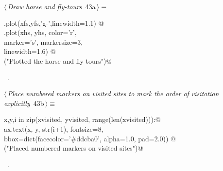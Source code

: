 \documentclass[11.5pt]{report}
\begin{document}
\begin{flushleft} \small
\begin{minipage}{\linewidth}\label{scrap55}\raggedright\small
{} $\langle\,${\itshape Draw horse and fly-tours}\nobreak\ {\footnotesize {43a}}$\,\rangle\equiv$
\vspace{-1ex}
\begin{list}{}{} \item
\mbox{}\verb@ax.plot(xfs,yfs,'g-',linewidth=1.1)  @\\
\mbox{}\verb@ax.plot(xhs, yhs, color='r', \@\\
\mbox{}\verb@        marker='s', markersize=3, \@\\
\mbox{}\verb@        linewidth=1.6) @\\
\mbox{}\verb@debug("Plotted the horse and fly tours")@\\
\mbox{}\verb@@{\NWsep}
\end{list}
\vspace{-1.5ex}
\footnotesize
\begin{list}{}{\setlength{\itemsep}{-\parsep}\setlength{\itemindent}{-\leftmargin}}
\item \NWtxtMacroRefIn\ .

\item{}
\end{list}
\end{minipage}\vspace{4ex}
\end{flushleft}

\begin{flushleft} \small\label{scrap56}\raggedright\small
{} $\langle\,${\itshape Place numbered markers on visited sites to mark the order of visitation explicitly}\nobreak\ {\footnotesize {43b}}$\,\rangle\equiv$
\vspace{-1ex}
\begin{list}{}{} \item
\mbox{}\verb@for x,y,i in zip(xvisited, yvisited, range(len(xvisited))):@\\
\mbox{}\verb@     ax.text(x, y, str(i+1),  fontsize=8, \@\\
\mbox{}\verb@             bbox=dict(facecolor='#ddcba0', alpha=1.0, pad=2.0)) @\\
\mbox{}\verb@debug("Placed numbered markers on visited sites")@\\
\mbox{}\verb@@{\NWsep}
\end{list}
\vspace{-1.5ex}
\footnotesize
\begin{list}{}{\setlength{\itemsep}{-\parsep}\setlength{\itemindent}{-\leftmargin}}
\item \NWtxtMacroRefIn\ .

\item{}
\end{list}
\vspace{4ex}
\end{flushleft}
\end{document}
